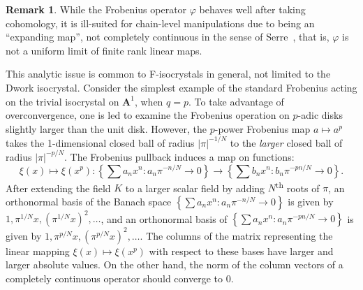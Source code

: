 \documentclass{amsart}
\numberwithin{equation}{section}
\theoremstyle{plain}
\theoremstyle{definition}
\newtheorem{remark}[equation]{Remark}
\renewcommand{\mathbb}{\mathbf}
\begin{document}
\begin{remark}
While the Frobenius operator \(\varphi\) behaves well after taking
cohomology, it is ill-suited for chain-level manipulations due to
being an ``expanding map'', not completely continuous in the sense of
Serre~\cite{serre:completely-continuous-endomorphisms-on-p-adic-banach-spaces},
that is, \(\varphi\) is not a uniform limit of finite rank linear
maps.

This analytic issue is common to F-isocrystals in general, not limited
to the Dwork isocrystal.  Consider the simplest example of the
standard Frobenius acting on the trivial isocrystal on
\(\mathbb{A}^{1}\), when \(q = p\).  To take advantage of
overconvergence, one is led to examine the Frobenius operation on
\(p\)-adic disks slightly larger than the unit disk.  However, the
\(p\)-power Frobenius map \(a \mapsto a^{p}\) takes the 1-dimensional
closed ball of radius \(|\pi|^{-1/N}\) to the \emph{larger} closed
ball of radius \(|\pi|^{-p/N}\).  The Frobenius pullback induces a map
on functions:
\[
\xi (x) \mapsto \xi(x^{p}) \colon \left\{ \sum a_{n} x^{n} : a_{n} \pi^{-n/N} \to 0 \right\}
\to \left\{ \sum b_{n} x^{n} : b_{n} \pi^{-pn/N} \to 0 \right\}.
\]
After extending the field \(K\) to a larger scalar field by adding
\(N\)\textsuperscript{th} roots of \(\pi\), an orthonormal basis of
the Banach space
\(\left\{\sum a_{n} x^{n} : a_{n} \pi^{-n/N} \to 0\right\}\) is given
by \(1, \pi^{1/N} x, (\pi^{1/N} x)^{2}, \ldots\), and an orthonormal
basis of \(\left\{\sum a_{n} x^{n} : a_{n} \pi^{-pn/N} \to 0\right\}\)
is given by \(1, \pi^{p/N} x, (\pi^{p/N} x)^{2}, \ldots\).  The
columns of the matrix representing the linear mapping
\(\xi(x) \mapsto \xi(x^{p})\) with respect to these bases have larger
and larger absolute values.  On the other hand, the norm of the column
vectors of a completely continuous operator should converge to \(0\).
\end{remark}
\end{document}
